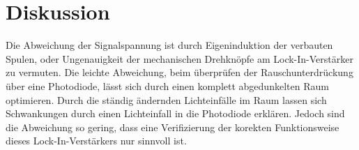 \section{Diskussion}
\label{sec:Diskussion}
Die Abweichung der Signalspannung ist durch Eigeninduktion der verbauten Spulen, oder Ungenauigkeit der mechanischen Drehknöpfe am Lock-In-Verstärker zu vermuten.
Die leichte Abweichung, beim überprüfen der Rauschunterdrückung über eine Photodiode,
lässt sich durch einen komplett abgedunkelten Raum optimieren.
Durch die ständig ändernden Lichteinfälle im Raum lassen sich Schwankungen durch einen Lichteinfall in die Photodiode erklären.
Jedoch sind die Abweichung so gering, dass eine Verifizierung der korekten Funktionsweise dieses Lock-In-Verstärkers nur sinnvoll ist.